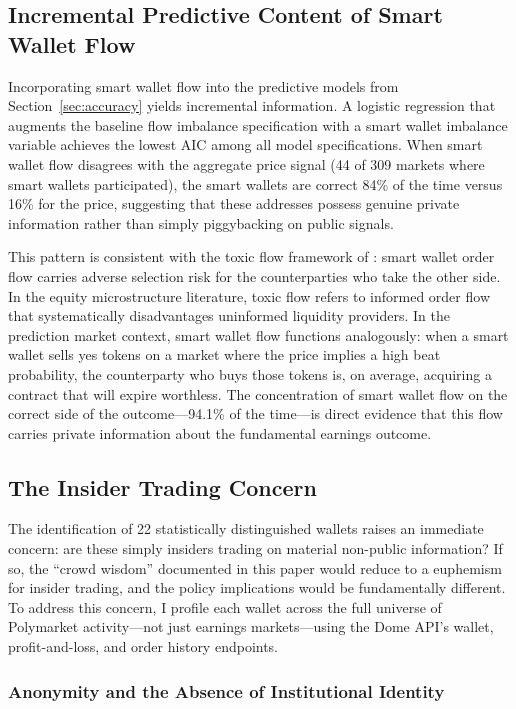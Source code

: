 \documentclass[11pt]{article}
\begin{document}
\subsection{Incremental Predictive Content of Smart Wallet Flow}

Incorporating smart wallet flow into the predictive models from Section~\ref{sec:accuracy} yields incremental information. A logistic regression that augments the baseline flow imbalance specification with a smart wallet imbalance variable achieves the lowest AIC among all model specifications. When smart wallet flow disagrees with the aggregate price signal (44 of 309 markets where smart wallets participated), the smart wallets are correct 84\% of the time versus 16\% for the price, suggesting that these addresses possess genuine private information rather than simply piggybacking on public signals.

This pattern is consistent with the toxic flow framework of \citet{easley2012flow}: smart wallet order flow carries adverse selection risk for the counterparties who take the other side. In the equity microstructure literature, toxic flow refers to informed order flow that systematically disadvantages uninformed liquidity providers. In the prediction market context, smart wallet flow functions analogously: when a smart wallet sells yes tokens on a market where the price implies a high beat probability, the counterparty who buys those tokens is, on average, acquiring a contract that will expire worthless. The concentration of smart wallet flow on the correct side of the outcome---94.1\% of the time---is direct evidence that this flow carries private information about the fundamental earnings outcome.

\subsection{The Insider Trading Concern}

The identification of 22 statistically distinguished wallets raises an immediate concern: are these simply insiders trading on material non-public information? If so, the ``crowd wisdom'' documented in this paper would reduce to a euphemism for insider trading, and the policy implications would be fundamentally different. To address this concern, I profile each wallet across the full universe of Polymarket activity---not just earnings markets---using the Dome API's wallet, profit-and-loss, and order history endpoints.

\subsubsection{Anonymity and the Absence of Institutional Identity}
\end{document}
